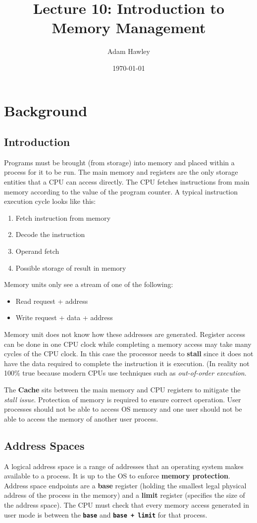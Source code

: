 \documentclass[11pt]{article}
\author{Adam Hawley}
\date{\today}
\title{Lecture 10: Introduction to Memory Management}
\begin{document}
\maketitle
\tableofcontents


\section{Background}
\label{sec:org108347d}
\subsection{Introduction}
\label{sec:org3fbf65e}
Programs must be brought (from storage) into memory and placed within a process for it to be run.
The main memory and registers are the only storage entities that a CPU can access directly.
The CPU fetches instructions from main memory according to the value of the program counter.
A typical instruction execution cycle looks like this:
\begin{enumerate}
\item Fetch instruction from memory
\item Decode the instruction
\item Operand fetch
\item Possible storage of result in memory
\end{enumerate}

Memory units only see a stream of one of the following:
\begin{itemize}
\item Read request + address
\item Write request + data + address
\end{itemize}
Memory unit does not know how these addresses are generated.
Register access can be done in one CPU clock while completing a memory access may take many cycles of the CPU clock.
In this case the processor needs to \textbf{stall} since it does not have the data required to complete the instruction it is execution.
(In reality not 100\% true because modern CPUs use techniques such as \emph{out-of-order execution}.

The \textbf{Cache} sits between the main memory and CPU registers to mitigate the \emph{stall issue}.
Protection of memory is required to ensure correct operation.
User processes should not be able to access OS memory and one user should not be able to access the memory of another user process.

\subsection{Address Spaces}
\label{sec:orgb71abd2}
A logical address space is a range of addresses that an operating system makes available to a process.
It is up to the OS to enforce \textbf{memory protection}.
Address space endpoints are a \textbf{base} register (holding the smallest legal physical address of the process in the memory) and a \textbf{limit} register (specifies the size of the address space).
The CPU must check that every memory access generated in user mode is between the \textbf{\texttt{base}} and \textbf{\texttt{base + limit}} for that process.
\end{document}

